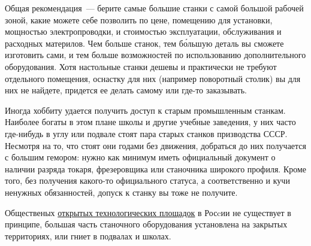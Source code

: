 \bigskip

Общая рекомендация\ --- берите самые большие станки с самой большой рабочей
зоной, какие можете себе позволить по цене, помещению для установки, мощностью
электропроводки, и стоимостью эксплуатации, обслуживания и расходных материлов.
Чем больше станок, тем б\'{о}льшую деталь вы сможете изготовить сами, и тем
больше возможностей по использованию дополнительного оборудования. Хотя
настольные станки дешевы и практически не требуют отдельного помещения, оснастку
для них (например поворотный столик) вы для них не найдете, придется ее делать
самому или где-то заказывать.





\secdown

Иногда хоббиту удается получить доступ к старым промышленным станкам. Наиболее
богаты в этом плане школы и другие учебные заведения, у них часто где-нибудь в
углу или подвале стоят пара старых станков призводства СССР. Несмотря на то, что
стоят они годами без движения, добраться до них получается с большим гемором:
нужно как минимум иметь официальный документ о наличии разряда токаря,
фрезеровщика или станочника широкого профиля. Кроме того, без получения
какого-то официального статуса, а соответственно и кучи ненужных обязанностей,
допуск к станку вы тоже не получите.

Общественых
\href{https://github.com/ponyatov/CHBZ/blob/master/presentation.pdf?raw=true}{открытых
технологических площадок} в Росcии не существует в принципе, большая часть
станочного оборудования установлена на закрытых территориях, или гниет в
подвалах и школах. 





\secup

\secup
